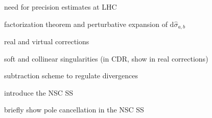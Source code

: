 \begin{frame}

  need for precision estimates at LHC

\end{frame}


\begin{frame}

  factorization theorem and perturbative expansion of $ \mathrm{d} \hat{\sigma}_{a,b} $

\end{frame}


\begin{frame}

  real and virtual corrections

\end{frame}


\begin{frame}

  soft and collinear singularities (in CDR, show in real corrections)

\end{frame}


\begin{frame}

  subtraction scheme to regulate divergences

\end{frame}


\begin{frame}

  introduce the NSC SS

\end{frame}


\begin{frame}

  briefly show pole cancellation in the NSC SS

\end{frame}

